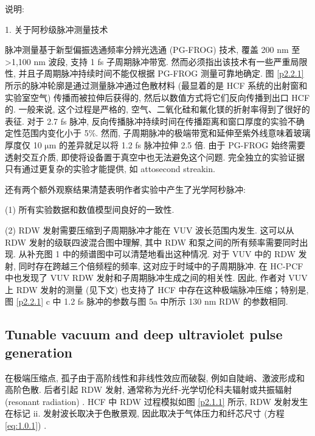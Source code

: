 \documentclass[14pt,a4paper,oneside]{article}
\numberwithin{equation}{subsection}             %
\numberwithin{figure}{subsection}               %
\begin{document}
说明: 

1. 关于阿秒级脉冲测量技术

脉冲测量基于新型偏振选通频率分辨光选通 (PG-FROG) 技术, 覆盖 200 nm 至 >1,100 nm 波段, 支持 1 fs 子周期脉冲带宽. 然而必须指出该技术有一些严重局限性, 并且子周期脉冲持续时间不能仅根据 PG-FROG 测量可靠地确定. 图 \ref{p2.2.1} 所示的脉冲轮廓是通过测量脉冲通过色散材料 (最显着的是 HCF 系统的出射窗和实验室空气) 传播而被拉伸后获得的, 然后以数值方式将它们反向传播到出口 HCF 的. 一般来说, 这个过程是严格的, 空气、二氧化硅和氟化镁的折射率得到了很好的表征. 对于 2.7 fs 脉冲, 反向传播脉冲持续时间在传播距离和窗口厚度的实验不确定性范围内变化小于 5\%. 然而, 子周期脉冲的极端带宽和延伸至紫外线意味着玻璃厚度仅 10 $\mathrm{\mu m}$ 的差异就足以将 1.2 fs 脉冲拉伸 2.5 倍. 由于 PG-FROG 始终需要透射交互介质, 即使将设备置于真空中也无法避免这个问题. 完全独立的实验证据只有通过更复杂的实验才能提供, 如 attosecond streakin\cite{hassanOpticalAttosecondPulses2016, wirthSynthesizedLightTransients2011}. 

还有两个额外观察结果清楚表明作者实验中产生了光学阿秒脉冲:

(1) 所有实验数据和数值模型间良好的一致性. 

(2) RDW 发射需要压缩到子周期脉冲才能在 VUV 波长范围内发生. 这可以从 RDW 发射的级联四波混合图中理解, 其中 RDW 和泵之间的所有频率需要同时出现. 从补充图 1 中的频谱图中可以清楚地看出这种情况. 对于 VUV 中的 RDW 发射, 同时存在跨越三个倍频程的频率, 这对应于时域中的子周期脉冲. 在 HC-PCF 中也发现了 VUV RDW 发射和子周期脉冲生成之间的相关性. 因此, 作者对 VUV 上 RDW 发射的测量 (见下文) 也支持了 HCF 中存在这种极端脉冲压缩；特别是, 图 \ref{p2.2.1} c 中 1.2 fs 脉冲的参数与图 5a 中所示 130 nm RDW 的参数相同. 

\subsection{Tunable vacuum and deep ultraviolet pulse generation}

在极端压缩点, 孤子由于高阶线性和非线性效应而破裂, 例如自陡峭、激波形成和高阶色散\cite{dudleySupercontinuumGenerationPhotonic2006, beaudUltrashortPulsePropagation1987, kodamaNonlinearPulsePropagation1987, husakouSupercontinuumGenerationHigherorder2001}. 后者引起 RDW 发射, 通常称为光纤-光学切伦科夫辐射或共振辐射 (resonant radiation) \cite{imHighpowerSolitoninducedSupercontinuum2010, jolyBrightSpatiallyCoherent2011, waiNonlinearPulsePropagation1986, makTunableVacuumUVVisible2013, ermolovSupercontinuumGenerationVacuum2015, kodamaNonlinearPulsePropagation1987, husakouSupercontinuumGenerationHigherorder2001, erkintaloCascadedPhaseMatching2012, akhmedievCherenkovRadiationEmitted1995}.  HCF 中 RDW 过程模拟如图 \ref{p2.1.1} 所示, RDW 发射发生在标记 ii. 发射波长取决于色散景观, 因此取决于气体压力和纤芯尺寸 (方程\ref{eq:1.0.1}) .
\end{document}
